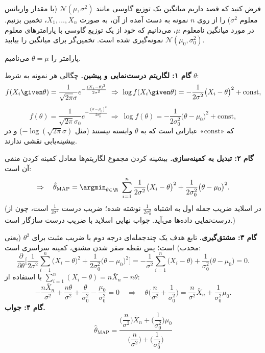 \begin{example}
فرض کنید که قصد داریم میانگین یک توزیع گاوسی مانند $\mathcal N(\mu,\sigma^2)$ (با مقدار واریانس معلوم $\sigma^2$) را از روی $n$ نمونه  به دست آمده از آن، به صورت $X_1,\ldots,X_n$، تخمین بزنیم. در مورد میانگین نامعلوم $\mu$، می‌دانیم که خود از یک توزیع گاوسی با پارامترهای معلوم $\mathcal N(\mu_0,\sigma_0^2)$ نمونه‌گیری شده است. تخمین‌گر  برای میانگین را بیابید.
\begin{solution}
پارامتر را $\theta=\mu$ می‌نامیم.

\textbf{گام ۱: لگاریتم درست‌نمایی و پیشین.} چگالی هر نمونه به شرط $\theta$:
\[
f(X_i\given\theta)=\frac{1}{\sqrt{2\pi}\sigma}e^{-\frac{(X_i-\theta)^2}{2\sigma^2}}
\ \Rightarrow\ \log f(X_i\given\theta)=-\frac{1}{2\sigma^2}\big(X_i-\theta\big)^2+\text{const},
\]
\[
f(\theta)=\frac{1}{\sqrt{2\pi}\sigma_0}e^{-\frac{(\theta-\mu_0)^2}{2\sigma_0^2}}
\ \Rightarrow\ \log f(\theta)=-\frac{1}{2\sigma_0^2}\big(\theta-\mu_0\big)^2+\text{const},
\]
که «$\text{const}$» عباراتی است که به $\theta$ وابسته نیستند (مثل $-\log(\sqrt{2\pi}\sigma)$) و در بیشینه‌یابی نقشی ندارند.

\textbf{گام ۲: تبدیل به کمینه‌سازی.} بیشینه کردن مجموع لگاریتم‌ها معادل کمینه کردن منفی آن است:
\[
\Rightarrow\quad\hat\theta_{\mathrm{MAP}}=\argmin_{\theta\in\R}\ \sum_{i=1}^n\frac{1}{2\sigma^2}\big(X_i-\theta\big)^2+\frac{1}{2\sigma_0^2}\big(\theta-\mu_0\big)^2 .
\]
(در اسلاید ضریب جمله اول به اشتباه $\frac{1}{2\sigma_0^2}$ نوشته شده؛ ضریب درست $\frac{1}{2\sigma^2}$ است، چون از درست‌نمایی داده‌ها می‌آید. جواب نهایی اسلاید با ضریب درست سازگار است.)

\textbf{گام ۳: مشتق‌گیری.} تابع هدف یک چندجمله‌ای درجه دوم با ضریب مثبت برای $\theta^2$ (یعنی محدب) است؛ پس نقطه صفر شدن مشتق، کمینه سراسری است:
\[
\frac{\partial}{\partial\theta}\Big[\frac{1}{2\sigma^2}\sum_{i=1}^n\big(X_i-\theta\big)^2+\frac{1}{2\sigma_0^2}\big(\theta-\mu_0\big)^2\Big]
=-\frac{1}{\sigma^2}\sum_{i=1}^n\big(X_i-\theta\big)+\frac{1}{\sigma_0^2}\big(\theta-\mu_0\big)=0 .
\]
با استفاده از $\sum_{i=1}^n(X_i-\theta)=n\bar X_n-n\theta$:
\[
-\frac{n\bar X_n}{\sigma^2}+\frac{n\theta}{\sigma^2}+\frac{\theta}{\sigma_0^2}-\frac{\mu_0}{\sigma_0^2}=0
\quad\Rightarrow\quad
\theta\Big(\frac{n}{\sigma^2}+\frac{1}{\sigma_0^2}\Big)=\frac{n}{\sigma^2}\bar X_n+\frac{1}{\sigma_0^2}\mu_0 .
\]
\textbf{گام ۴: جواب.}
\[
\boxed{\ \hat\theta_{\mathrm{MAP}}=\frac{\Big(\dfrac{n}{\sigma^2}\Big)\bar X_n+\Big(\dfrac{1}{\sigma_0^2}\Big)\mu_0}{\Big(\dfrac{n}{\sigma^2}\Big)+\Big(\dfrac{1}{\sigma_0^2}\Big)}\ }
\]
\end{solution}
\end{example}


